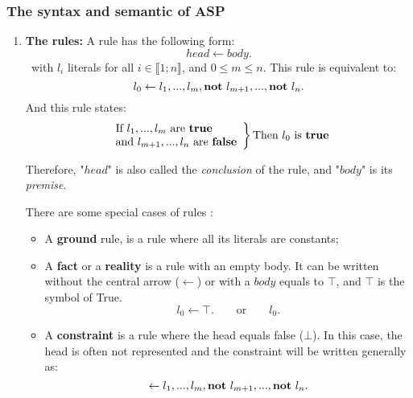 \subsubsection{The syntax and semantic of ASP}
\label{sectionSyntaxeASP}
\begin{enumerate}

\item \textbf{The rules:}
A rule has the following form:
\texttt{
\begin{equation} \label{eq1ASP}
 head \leftarrow body.
\end{equation}
}
with $l_{i}$ literals for all $i \in \llbracket 1 ; n \rrbracket$, and $0 \leq m \leq n$.
This rule is equivalent to:
\begin{equation} \label{eq2ASP}
l_{0} \leftarrow l_{1},...,l_{m}, \textbf{not}~ l_{m+1},..., \textbf{not}~ l_{n}.
\end{equation}
And this rule states:
\[
\left.
    \begin{array}{ll}
        \text{If} ~ l_{1},...,l_{m}  ~ \text{are \textbf{true}}\\
        \text{and} ~ l_{m+1},...,l_{n} ~ \text{are \textbf{false}}
    \end{array}
\right \} \text{Then} ~ l_{0} ~ \text{is } \textbf{true} 
\]

Therefore, "$head$" is also called the \emph{conclusion} of the rule,
and "$body$" is its \emph{premise}.

There are some special cases of rules \cite{Vladimir,baral2003knowledge}:
\begin{itemize}
\item A  \textbf{ground} rule, is a rule  where all its literals are constants;
\item A \textbf{fact} or a \textbf{reality} is a rule with an empty body.
  It can be written without the central arrow ($\leftarrow$) or with a $body$ equals to $\top$, and $\top$  is the symbol of True.
\begin{equation} 
l_{0} \leftarrow \top. \qquad \text{or} \qquad l_{0}.
 \label{eq5ASP}
\end{equation}


\item A \textbf{constraint} is a rule where the head equals false ($\bot$).
  In this case, the head is often not represented and the constraint will be written generally as:
\begin{equation} 
  \leftarrow l_{1},...,l_{m}, \textbf{not}~ l_{m+1},..., \textbf{not}~ l_{n}.
  \label{eq6ASP}
\end{equation}


\end{itemize}
\end{enumerate}
